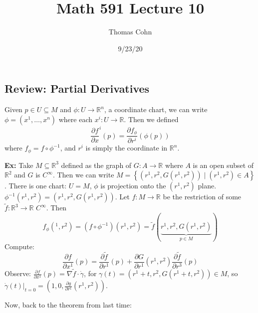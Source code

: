 \documentclass[10pt,letterpaper]{article}
\author{Thomas Cohn}
\title{Math 591 Lecture 10}
\date{9/23/20} %
\newcommand{\n}{\hfill\break}
\newcommand{\nn}{\vspace{0.5\baselineskip}\n}
\newcommand{\hangblock}[2]{\par\noindent\settowidth{\hangindent}{\textbf{#1: }}\textbf{#1: }\!\!\!#2}
\newcommand{\ex}[1]{\hangblock{Ex}{#1}}
\newcommand{\set}[1]{\left\{#1\right\}}
\newcommand{\reals}{\mathbb{R}}
\newcommand{\R}{\reals}
\newcommand{\inv}{^{-1}}
\newcommand{\of}{\circ}
\newcommand{\restr}[2]{\left.#1\right|_{#2}}
\newcommand{\pd}[2]{\frac{\partial{}#1}{\partial{}#2}}
\newcommand{\del}{\nabla}
\begin{document}
\maketitle
\setlength\RaggedRightParindent{\parindent}
\RaggedRight

\subsection*{Review: Partial Derivatives}

\par\noindent
Given $p\in{}U\subseteq{}M$ and $\phi:U\to\R^{n}$, a coordinate chart, we can write $\phi=(x^{1},\ldots,x^{n})$ where each $x^{i}:U\to\R$. Then we defined
\[
	\pd{f}x^{i}(p)=\pd{f_{\phi}}{r^{i}}(\phi(p))
\]
where $f_{\phi}=f\of\phi\inv$, and $r^{i}$ is simply the coordinate in $\R^{n}$.\n

\ex{
	Take $M\subseteq\R^{3}$ defined as the graph of $G:A\to\R$ where $A$ is an open subset of $\R^{2}$ and $G$ is $C^{\infty}$. Then we can write $M=\set{(r^{1},r^{2},G(r^{1},r^{2}))\mid{}(r^{1},r^{2})\in{}A}$. There is one chart: $U=M$, $\phi$ is projection onto the $(r^{1},r^{2})$ plane. $\phi\inv(r^{1},r^{2})=(r^{1},r^{2},G(r^{1},r^{2}))$.\nn
	Let $f:M\to\R$ be the restriction of some $\tilde{f}:\R^{3}\to\R$ $C^{\infty}$. Then
	\[
		f_{\phi}(^{1},r^{2})=(f\of\phi\inv)(r^{1},r^{2})=\tilde{f}(\underbrace{r^{1},r^{2},G(r^{1},r^{2})}_{p\in{}M})
	\]
	Compute:
	\[
		\pd{f}{x^{1}}(p)=\pd{\tilde{f}}{r^{1}}(p)+\pd{G}{r^{1}}(r^{1},r^{2})\pd{\tilde{f}}{r^{3}}(p)
	\]
	Observe: $\pd{f}{x^{1}}(p)=\del\tilde{f}\cdot\dot\gamma$, for $\gamma(t)=(r^{1}+t,r^{2},G(r^{1}+t,r^{2}))\in{}M$, so $\restr{\dot\gamma(t)}{t=0}=(1,0,\pd{g}{r^{1}}(r^{1},r^{2}))$.\n
}

\par\noindent
Now, back to the theorem from last time:\n
\end{document}
